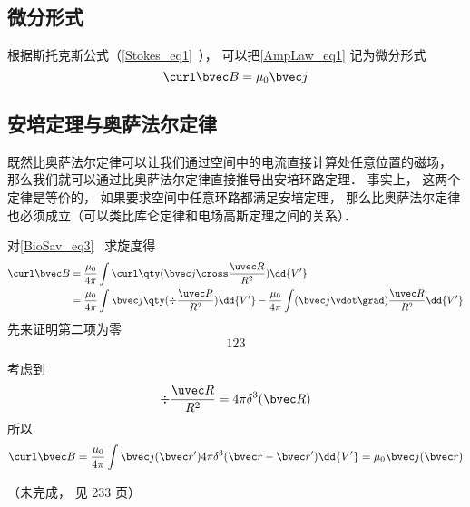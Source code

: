 \subsection{微分形式}
根据斯托克斯公式（\autoref{Stokes_eq1}~）， 可以把\autoref{AmpLaw_eq1} 记为微分形式
\begin{equation}
\curl \bvec B = \mu_0 \bvec j
\end{equation}



\subsection{安培定理与奥萨法尔定律}
既然比奥萨法尔定律可以让我们通过空间中的电流直接计算处任意位置的磁场， 那么我们就可以通过比奥萨法尔定律直接推导出安培环路定理． 事实上， 这两个定律是等价的， 如果要求空间中任意环路都满足安培定理， 那么比奥萨法尔定律也必须成立（可以类比库仑定律和电场高斯定理之间的关系）．%

对\autoref{BioSav_eq3}~ 求旋度得
\begin{equation}
\begin{aligned}
\curl \bvec B &= \frac{\mu_0}{4\pi} \int \curl \qty(\bvec j \cross \frac{\uvec R}{R^2}) \dd{V'}\\
&= \frac{\mu_0}{4\pi} \int\bvec j \qty(\div \frac{\uvec R}{R^2}) \dd{V'} -  \frac{\mu_0}{4\pi} \int(\bvec j \vdot \grad) \frac{\uvec R}{R^2} \dd{V'}
\end{aligned}
\end{equation}
先来证明第二项为零
\begin{equation}
123
\end{equation}

考虑到
\begin{equation}
\div \frac{\uvec R}{R^2} = 4\pi \delta^3(\bvec R)
\end{equation}
所以
\begin{equation}
\curl \bvec B = \frac{\mu_0}{4\pi} \int \bvec j(\bvec r') 4\pi \delta^3(\bvec r - \bvec r') \dd{V'} = \mu_0 \bvec j(\bvec r)
\end{equation}



（未完成， 见 \cite{GriffE} 233 页）
